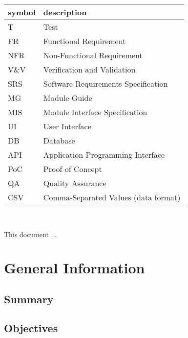 \documentclass[12pt, titlepage]{article}
\begin{document}
\renewcommand{\arraystretch}{1.2}
\begin{tabular}{l l} 
  \toprule		
  \textbf{symbol} & \textbf{description}\\
  \midrule 
  T & Test\\
  FR & Functional Requirement\\
  NFR & Non-Functional Requirement\\
  V\&V & Verification and Validation\\
  SRS & Software Requirements Specification\\
  MG & Module Guide\\
  MIS & Module Interface Specification\\
  UI & User Interface\\
  DB & Database\\
  API & Application Programming Interface\\
  PoC & Proof of Concept\\
  QA & Quality Assurance\\
  CSV & Comma-Separated Values (data format)\\
  \bottomrule
\end{tabular}\\



\newpage


This document ... 

\section{General Information}

\subsection{Summary}


\subsection{Objectives}
\end{document}
